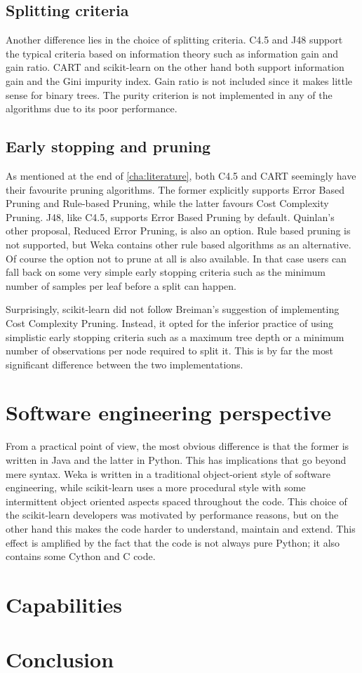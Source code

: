 
\subsection{Splitting criteria}
Another difference lies in the choice of splitting criteria. C4.5 and J48 support the typical criteria based on information theory such as information gain and gain ratio. CART and scikit-learn on the other hand both support information gain and the Gini impurity index. Gain ratio is not included since it makes little sense for binary trees. The purity criterion is not implemented in any of the algorithms due to its poor performance.

\subsection{Early stopping and pruning}
As mentioned at the end of \autoref{cha:literature}, both C4.5 and CART seemingly have their favourite pruning algorithms. The former explicitly supports Error Based Pruning and Rule-based Pruning, while the latter favours Cost Complexity Pruning. J48, like C4.5, supports Error Based Pruning by default. Quinlan's other proposal, Reduced Error Pruning, is also an option. Rule based pruning is not supported, but Weka contains other rule based algorithms as an alternative. Of course the option not to prune at all is also available. In that case users can fall back on some very simple early stopping criteria such as the minimum number of samples per leaf before a split can happen.

Surprisingly, scikit-learn did not follow Breiman's suggestion of implementing Cost Complexity Pruning. Instead, it opted for the inferior practice of using simplistic early stopping criteria such as a maximum tree depth or a minimum number of observations per node required to split it. This is by far the most significant difference between the two implementations.


\section{Software engineering perspective}
From a practical point of view, the most obvious difference is that the former is written in Java and the latter in Python. This has implications that go beyond mere syntax. Weka is written in a traditional object-orient style of software engineering, while scikit-learn uses a more procedural style with some intermittent object oriented aspects spaced throughout the code. This choice of the scikit-learn developers was motivated by performance reasons, but on the other hand this makes the code harder to understand, maintain and extend. This effect is amplified by the fact that the code is not always pure Python; it also contains some Cython and C code.

\section{Capabilities}

\section{Conclusion}
